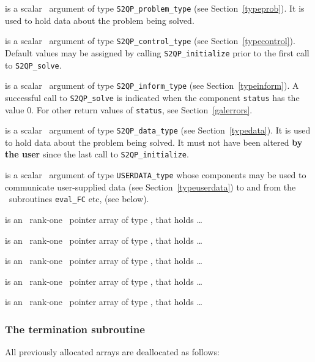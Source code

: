 \documentclass{galahad}
\newcommand{\packagename}{S2QP}
\begin{document}
\vspace*{-3mm}
\begin{description}
 is a scalar \intentinout\ argument of type 
{\tt \packagename\_problem\_type}
(see Section~\ref{typeprob}). 
It is used to hold data about the problem being solved.

 is a scalar \intentin\ argument of type 
{\tt \packagename\_control\_type}
(see Section~\ref{typecontrol}). Default values may be assigned by calling 
{\tt \packagename\_initialize} 
prior to the first call to 
{\tt \packagename\_solve}.

 is a scalar \intentout\ argument of type 
{\tt \packagename\_inform\_type}
(see Section~\ref{typeinform}). A successful call to
{\tt \packagename\_solve}
is indicated when the  component {\tt status} has the value 0. 
For other return values of {\tt status}, see Section~\ref{galerrors}.

 is a scalar \intentinout\ argument of type 
{\tt \packagename\_data\_type}
(see Section~\ref{typedata}). It is used to hold data about the problem being 
solved. It must not have been altered {\bf by the user} since the last call to 
{\tt \packagename\_initialize}.

 is a scalar \intentinout\ argument of type
{\tt USERDATA\_type} whose components may be used
to communicate user-supplied data
(see Section~\ref{typeuserdata})
to and from the \optional\ subroutines
{\tt eval\_FC} etc, (see below).

 is an \optional\ rank-one \intentin\ pointer array of type 
 \realdp,  that holds \ldots

 is an \optional\ rank-one \intentin\ pointer array of type 
 \realdp,  that holds \ldots

 is an \optional\ rank-one \intentin\ pointer array of type 
 \realdp,  that holds \ldots

 is an \optional\ rank-one \intentin\ pointer array of type 
 \realdp,  that holds \ldots

 is an \optional\ rank-one \intentin\ pointer array of type 
 \realdp,  that holds \ldots

\end{description}


\subsubsection{The  termination subroutine}
All previously allocated arrays are deallocated as follows:
\vspace*{1mm}
\end{document}
